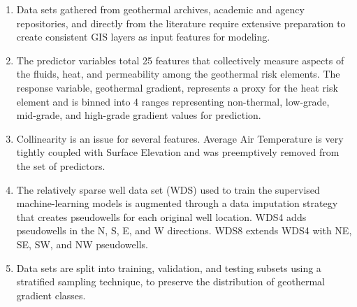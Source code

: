 \begin{enumerate}
    \item Data sets gathered from geothermal archives, academic and agency repositories, and directly from the literature require extensive preparation to create consistent GIS layers as input features for modeling.

    \item The predictor variables total 25 features that collectively measure aspects of the fluids, heat, and permeability among the geothermal risk elements. The response variable, geothermal gradient, represents a proxy for the heat risk element and is binned into 4 ranges representing non-thermal, low-grade, mid-grade, and high-grade gradient values for prediction.
    \item Collinearity is an issue for several features. Average Air Temperature is very tightly coupled with Surface Elevation and was preemptively removed from the set of predictors.
    
    \item The relatively sparse well data set (WDS) used to train the supervised machine-learning models is augmented through a data imputation strategy that creates pseudowells for each original well location. WDS4 adds pseudowells in the N, S, E, and W directions. WDS8 extends WDS4 with NE, SE, SW, and NW pseudowells.
    

    \item Data sets are split into training, validation, and testing subsets using a stratified sampling technique, to preserve the distribution of geothermal gradient classes.
    


\end{enumerate}
